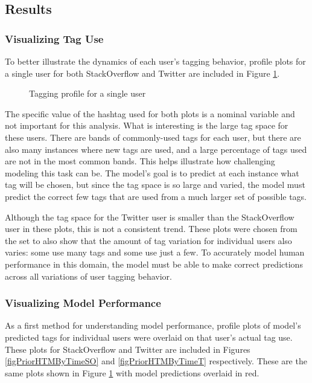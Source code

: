 \documentclass[man,floatsintext,donotrepeattitle]{apa6}
\begin{document}
\subsection{Results}

\subsubsection{Visualizing Tag Use}

To better illustrate the dynamics of each user's tagging behavior,
profile plots for a single user for both StackOverflow and Twitter are included in Figure \ref{figPriorHTByTime}.

\begin{figure}[!htbp]
  {%
    \setlength{\fboxsep}{0pt}%
    \setlength{\fboxrule}{1pt}%
    \hfill
    \hfill
    \caption{Tagging profile for a single user}
    \label{figPriorHTByTime}
  }%
\end{figure}

The specific value of the hashtag used for both plots is a nominal variable and not important for this analysis.
What is interesting is the large tag space for these users.
There are bands of commonly-used tags for each user, but there are also many instances where new tags are used, and a large percentage of tags used are not in the most common bands.
This helps illustrate how challenging modeling this task can be.
The model's goal is to predict at each instance what tag will be chosen, but since the tag space is so large and varied, the model must predict the correct few tags that are used from a much larger set of possible tags.

Although the tag space for the Twitter user is smaller than the StackOverflow user in these plots, this is not a consistent trend.
These plots were chosen from the set to also show that the amount of tag variation for individual users also varies: some use many tags and some use just a few.
To accurately model human performance in this domain, the model must be able to make correct predictions across all variations of user tagging behavior. 

\subsubsection{Visualizing Model Performance}

As a first method for understanding model performance, profile plots of model's predicted tags for individual users were overlaid on that user's actual tag use.
These plots for StackOverflow and Twitter are included in Figures \ref{figPriorHTMByTimeSO} and \ref{figPriorHTMByTimeT} respectively.
These are the same plots shown in Figure \ref{figPriorHTByTime} with model predictions overlaid in red. 
\end{document}
